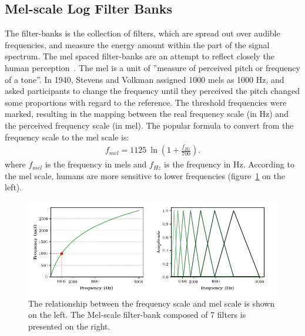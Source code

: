 \subsection*{Mel-scale Log Filter Banks}

The filter-banks is the collection of filters, which are spread out over audible frequencies,
and measure the energy amount within the part of the signal spectrum.
The mel spaced filter-banks are an attempt to reflect closely the human perception~\cite{stevens1937}.
The mel is a unit of ”measure of perceived pitch or frequency of a tone”.
In 1940, Stevens and Volkman assigned 1000 mels as 1000 Hz, and asked participants to change
the frequency until they perceived the pitch
changed some proportions with regard to the reference.
The threshold frequencies were marked, resulting in the mapping between
the real frequency scale (in Hz) and the perceived frequency scale (in mel).
The popular formula to convert from the frequency scale to the mel scale is:
\begin{align}
f_{mel} = 1125 \: \ln (1 + \frac{f_{Hz}}{700}).
\end{align}
where $f_{mel}$ is the frequency in mels and $f_{Hz}$ is the frequency in Hz.
According to the mel scale, humans are more sensitive to lower frequencies (figure~\ref{fig:mel_scale} on the left).

\begin{figure}[!h]
    \centering
    \includegraphics[width=13cm]{figures/mel-scale.png}
    \caption{
    The relationship between the frequency scale and mel scale is shown on the left.
    The Mel-scale filter-bank composed of 7 filters is presented on the right.
    }
    \label{fig:mel_scale}
\end{figure}

